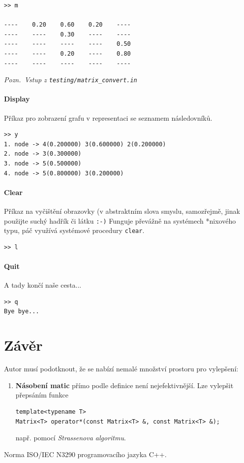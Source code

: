 \documentclass[11pt,a4paper]{article}
\newcommand{\cpp}{\textsc{C++}}
\begin{document}
\begin{verbatim}
>> m

----    0.20    0.60    0.20    ----
----    ----    0.30    ----    ----
----    ----    ----    ----    0.50
----    ----    0.20    ----    0.80
----    ----    ----    ----    ----
\end{verbatim}

{\noindent \sl Pozn.~Vstup z \tt testing/matrix\_convert.in}

\subsection{Display}
Příkaz pro zobrazení grafu v representaci se seznamem následovníků.



\begin{verbatim}
>> y
1. node -> 4(0.200000) 3(0.600000) 2(0.200000)
2. node -> 3(0.300000)
3. node -> 5(0.500000)
4. node -> 5(0.800000) 3(0.200000)
\end{verbatim}

\subsection{Clear}
Příkaz na vyčištění obrazovky (v abstraktním slova smyslu, samozřejmě, jinak
použijte suchý hadřík či látku {\tt :-)}
Funguje převážně na systémech *nixového typu, páč využívá systémové procedury
\verb=clear=.

\begin{verbatim}
>> l
\end{verbatim}

\subsection{Quit}
A tady končí naše cesta...

\begin{verbatim}
>> q
Bye bye...
\end{verbatim}

\pagebreak

\part{Závěr}

Autor musí podotknout, že se nabízí nemalé množství prostoru pro vylepšení:
\begin{enumerate}
  \item {\bf Násobení matic\/} přímo podle definice není nejefektivnější.
    Lze vylepšit přepsáním funkce
\begin{verbatim}template<typename T>
Matrix<T> operator*(const Matrix<T> &, const Matrix<T> &);\end{verbatim}
    např. pomocí \emph{Strassenova algoritmu\/}.
\end{enumerate}

\pagebreak

\begin{thebibliography}{9}

Norma \textsc{ISO/IEC N3290} programovacího jazyka \cpp.

\end{thebibliography}
\end{document}
